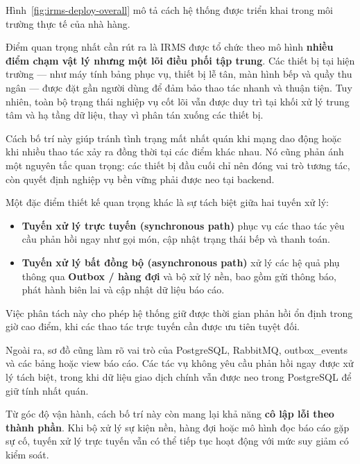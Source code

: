 Hình~\ref{fig:irms-deploy-overall} mô tả cách hệ thống được triển khai trong môi trường thực tế của nhà hàng. 

Điểm quan trọng nhất cần rút ra là IRMS được tổ chức theo mô hình \textbf{nhiều điểm chạm vật lý nhưng một lõi điều phối tập trung}. Các thiết bị tại hiện trường --- như máy tính bảng phục vụ, thiết bị lễ tân, màn hình bếp và quầy thu ngân --- được đặt gần người dùng để đảm bảo thao tác nhanh và thuận tiện. Tuy nhiên, toàn bộ trạng thái nghiệp vụ cốt lõi vẫn được duy trì tại khối xử lý trung tâm và hạ tầng dữ liệu, thay vì phân tán xuống các thiết bị.

Cách bố trí này giúp tránh tình trạng mất nhất quán khi mạng dao động hoặc khi nhiều thao tác xảy ra đồng thời tại các điểm khác nhau. Nó cũng phản ánh một nguyên tắc quan trọng: các thiết bị đầu cuối chỉ nên đóng vai trò tương tác, còn quyết định nghiệp vụ bền vững phải được neo tại backend.

Một đặc điểm thiết kế quan trọng khác là sự tách biệt giữa hai tuyến xử lý:

\begin{itemize}
  \item \textbf{Tuyến xử lý trực tuyến (synchronous path)} phục vụ các thao tác yêu cầu phản hồi ngay như gọi món, cập nhật trạng thái bếp và thanh toán.
  \item \textbf{Tuyến xử lý bất đồng bộ (asynchronous path)} xử lý các hệ quả phụ thông qua \textbf{Outbox / hàng đợi} và bộ xử lý nền, bao gồm gửi thông báo, phát hành biên lai và cập nhật dữ liệu báo cáo.
\end{itemize}

Việc phân tách này cho phép hệ thống giữ được thời gian phản hồi ổn định trong giờ cao điểm, khi các thao tác trực tuyến cần được ưu tiên tuyệt đối.

Ngoài ra, sơ đồ cũng làm rõ vai trò của \textsf{PostgreSQL}, \textsf{RabbitMQ}, \textsf{outbox\_events} và các bảng hoặc view báo cáo. Các tác vụ không yêu cầu phản hồi ngay được xử lý tách biệt, trong khi dữ liệu giao dịch chính vẫn được neo trong PostgreSQL để giữ tính nhất quán.

Từ góc độ vận hành, cách bố trí này còn mang lại khả năng \textbf{cô lập lỗi theo thành phần}. Khi bộ xử lý sự kiện nền, hàng đợi hoặc mô hình đọc báo cáo gặp sự cố, tuyến xử lý trực tuyến vẫn có thể tiếp tục hoạt động với mức suy giảm có kiểm soát.

